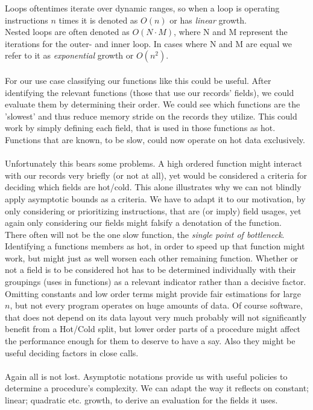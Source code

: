Loops oftentimes iterate over dynamic ranges, so when a loop is operating instructions $n$ times it is denoted as $O(n)$ or has \textit{linear} growth.\\
Nested loops are often denoted as $O(N\cdot M)$, where N and M represent the iterations for the outer- and inner loop. In cases where N and M are equal we refer to it as \textit{exponential} growth or $O(n^2)$.\\\\
For our use case classifying our functions like this could be useful. After identifying the relevant functions (those that use our records' fields), we could evaluate them by determining their order. We could see which functions are the 'slowest' and thus reduce memory stride on the records they utilize. This could work by simply defining each field, that is used in those functions as hot. Functions that are known, to be slow, could now operate on hot data exclusively.\\\\
Unfortunately this bears some problems. A high ordered function might interact with our records very briefly (or not at all), yet would be considered a criteria for deciding which fields are hot/cold. This alone illustrates why we can not blindly apply asymptotic bounds as a criteria. We have to adapt it to our motivation, by only considering or prioritizing instructions, that are (or imply) field usages, yet again only considering our fields might falsify a denotation of the function.\\
There often will not be the one slow function, the \textit{single point of bottleneck}. Identifying a functions members as hot, in order to speed up that function might work, but might just as well worsen each other remaining function. Whether or not a field is to be considered hot has to be determined individually with their groupings (uses in functions) as a relevant indicator rather than a decisive factor.\\
Omitting constants and low order terms might provide fair estimations for large $n$, but not every program operates on huge amounts of data. Of course software, that does not depend on its data layout very much probably will not significantly benefit from a Hot/Cold split, but lower order parts of a procedure might affect the performance enough for them to deserve to have a say. Also they might be useful deciding factors in close calls.\\\\
Again all is not lost. Asymptotic notations provide us with useful policies to determine a procedure's complexity. We can adapt the way it reflects on constant; linear; quadratic etc. growth, to derive an evaluation for the fields it uses. 
\newline
